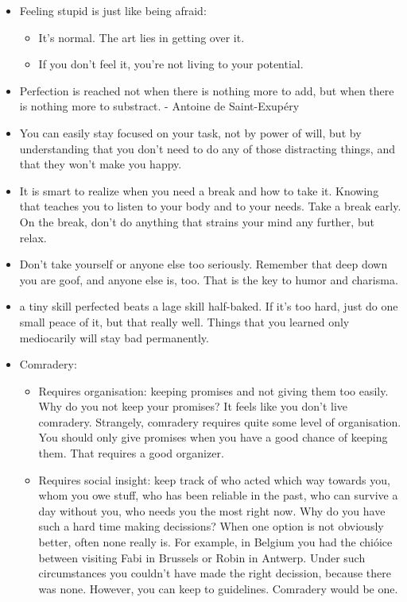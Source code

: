 \begin{itemize}
    \item Feeling stupid is just like being afraid: 
        \begin{itemize}
            \item It's normal. The art lies in getting over it.
            \item If you don't feel it, you're not living to your potential.
        \end{itemize}
        
    \item Perfection is reached not when there is nothing more to add, but when there is nothing more to substract. - Antoine de Saint-Exupéry
    
    \item You can easily stay focused on your task, not by power of will, but by understanding that you don't need to do any of those distracting things, and that they won't make you happy.
    
    \item It is smart to realize when you need a break and how to take it. Knowing that teaches you to listen to your body and to your needs. Take a break early. On the break, don't do anything that strains your mind any further, but relax.
    
    \item Don't take yourself or anyone else too seriously. Remember that deep down you are goof, and anyone else is, too. That is the key to humor and charisma. 
    
    \item a tiny skill perfected beats a lage skill half-baked. If it's too hard, just do one small peace of it, but that really well. Things that you learned only mediocarily will stay bad permanently.  
    
    \item Comradery: 
        \begin{itemize}
            \item Requires organisation: keeping promises and not giving them too easily. Why do you not keep your promises? It feels like you don't live comradery. Strangely, comradery requires quite some level of organisation. You should only give promises when you have a good chance of keeping them. That requires a good organizer. 
            \item Requires social insight: keep track of who acted which way towards you, whom you owe stuff, who has been reliable in the past, who can survive a day without you, who needs you the most right now. Why do you have such a hard time making decissions? When one option is not obviously better, often none really is. For example, in Belgium you had the chióice between visiting Fabi in Brussels or Robin in Antwerp. Under such circumstances you couldn't have made the right decission, because there was none. However, you can keep to guidelines. Comradery would be one.  
        \end{itemize}
    

\end{itemize}
